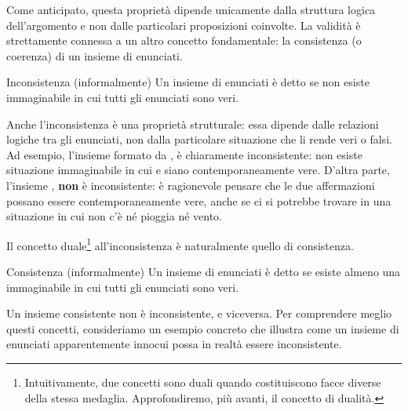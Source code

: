 Come anticipato, questa proprietà dipende unicamente dalla struttura logica dell'argomento e non dalle particolari proposizioni coinvolte.
La validità è strettamente connessa a un altro concetto fondamentale: la consistenza (o coerenza) di un insieme di enunciati.

\begin{definition}{Inconsistenza (informalmente)}
  Un insieme di enunciati è detto  se non esiste  immaginabile in cui tutti gli enunciati sono veri.
\end{definition}

Anche l'inconsistenza è una proprietà strutturale: essa dipende dalle relazioni logiche tra gli enunciati, non dalla particolare situazione che li rende veri o falsi.
Ad esempio, l'insieme formato da ,  è chiaramente inconsistente: non esiste situazione immaginabile in cui  e  siano contemporaneamente vere.
D'altra parte, l'insieme ,  \textbf{non} è inconsistente: è ragionevole pensare che le due affermazioni possano essere contemporaneamente vere, anche se ci si potrebbe trovare in una situazione in cui non c'è né pioggia né vento.

Il concetto duale\footnote{Intuitivamente, due concetti sono duali quando costituiscono facce diverse della stessa medaglia. Approfondiremo, più avanti, il concetto di dualità.} all'inconsistenza è naturalmente quello di consistenza.

\begin{definition}{Consistenza (informalmente)}
  Un insieme di enunciati è detto  se esiste almeno una  immaginabile in cui tutti gli enunciati sono veri.
\end{definition}

Un insieme consistente non è inconsistente, e viceversa.
Per comprendere meglio questi concetti, consideriamo un esempio concreto che illustra come un insieme di enunciati apparentemente innocui possa in realtà essere inconsistente.

